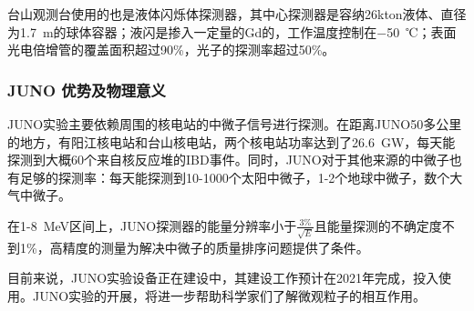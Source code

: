 \documentclass[10pt,a4paper]{article}
\begin{document}
台山观测台使用的也是液体闪烁体探测器，其中心探测器是容纳26kton液体、直径为\SI{1.7}{m}的球体容器；液闪是掺入一定量的Gd的，工作温度控制在\SI{-50}{℃}；表面光电倍增管的覆盖面积超过90\%，光子的探测率超过50\%。


\subsubsection{JUNO 优势及物理意义}\label{sub:logicinter}

JUNO实验主要依赖周围的核电站的中微子信号进行探测。在距离JUNO50多公里的地方，有阳江核电站和台山核电站，两个核电站功率达到了\SI{26.6}{GW}，每天能探测到大概60个来自核反应堆的IBD事件。同时，JUNO对于其他来源的中微子也有足够的探测率：每天能探测到10-1000个太阳中微子，1-2个地球中微子，数个大气中微子。

在1-\SI{8 }{MeV}区间上，JUNO探测器的能量分辨率小于$\frac{3\%}{\sqrt{E}}$且能量探测的不确定度不到1\%，高精度的测量为解决中微子的质量排序问题提供了条件。

目前来说，JUNO实验设备正在建设中，其建设工作预计在2021年完成，投入使用。JUNO实验的开展，将进一步帮助科学家们了解微观粒子的相互作用。
\end{document}
